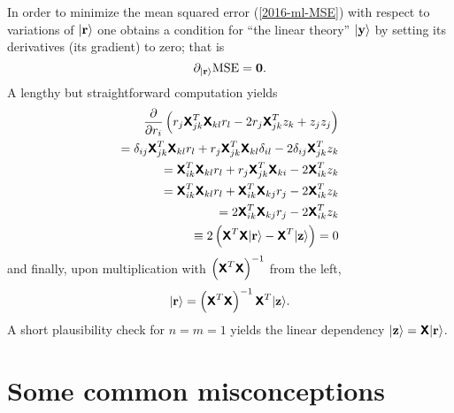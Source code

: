 {\begin{enumerate}
In order to minimize the mean squared error (\ref{2016-ml-MSE}) with respect to variations of $\vert {\bf r} \rangle$
one obtains a condition for ``the linear theory'' $\vert {\bf y} \rangle$
by setting its derivatives (its gradient) to zero; that is
\begin{equation}
\partial_{ \vert {\bf r} \rangle } \text{MSE}
=
{\bf 0}.
\label{2016-ml-MSE-min}
\end{equation}
A lengthy but straightforward computation yields
\begin{equation}
\begin{split}
\frac{\partial }{\partial r_i}
\left(
r_j  \textsf{\textbf{X}}^T_{jk} \textsf{\textbf{X}}_{kl} r_l -2 r_j \textsf{\textbf{X}}^T_{jk}z_k + z_jz_j
\right)
\\
=
\delta_{ij}  \textsf{\textbf{X}}^T_{jk} \textsf{\textbf{X}}_{kl} r_l
+
r_j \textsf{\textbf{X}}^T_{jk} \textsf{\textbf{X}}_{kl}  \delta_{il}
-2 \delta_{ij} \textsf{\textbf{X}}^T_{jk}z_k
\\
=
\textsf{\textbf{X}}^T_{ik} \textsf{\textbf{X}}_{kl} r_l
+
r_j \textsf{\textbf{X}}^T_{jk} \textsf{\textbf{X}}_{ki}
-2 \textsf{\textbf{X}}^T_{ik}z_k
\\
=
\textsf{\textbf{X}}^T_{ik} \textsf{\textbf{X}}_{kl} r_l
+
\textsf{\textbf{X}}^T_{ik} \textsf{\textbf{X}}_{kj} r_j
-2 \textsf{\textbf{X}}^T_{ik}z_k
\\
=
2 \textsf{\textbf{X}}^T_{ik} \textsf{\textbf{X}}_{kj} r_j
-2 \textsf{\textbf{X}}^T_{ik} z_k
\\
\equiv
2\left( \textsf{\textbf{X}}^T \textsf{\textbf{X}} \vert {\bf r} \rangle - \textsf{\textbf{X}}^T   \vert {\bf z} \rangle
\right)
=0
\end{split}
\label{2016-ml-MSE-min-res-der}
\end{equation}
and finally, upon multiplication with
$ \left( \textsf{\textbf{X}}^T \textsf{\textbf{X}}  \right)^{-1}$ from the left,
\begin{equation}
\vert {\bf r} \rangle
=  \left( \textsf{\textbf{X}}^T \textsf{\textbf{X}} \right)^{-1}
\textsf{\textbf{X}}^T \vert {\bf z} \rangle
.
\label{2016-ml-MSE-min-res}
\end{equation}
A short plausibility check for $n=m=1$ yields the linear dependency
$\vert {\bf z} \rangle  =  \textsf{\textbf{X}} \vert {\bf r} \rangle$.




\end{enumerate}

\eexample
}

\section{Some common misconceptions}

